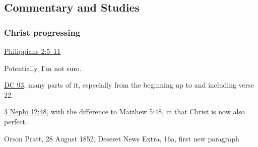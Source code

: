 	
	
	
	
\subsection{Commentary and Studies} %
	\label{CHRIST-COMMENTARY}

	
		
	\subsubsection{Christ progressing}
		\label{CHRIST-progressing}
		
		\begin{compactitem}
			\item \hyperref[PHILIPPIANS-2-5]{Philippians 2:5--11}
				\begin{compactitem}
					\item Potentially, I'm not sure.
				\end{compactitem}
			\item \hyperref[DC93]{DC 93}, many parts of it, especially from the beginning up to and including verse 22.
			\item \hyperref[3NEPHI-12-48]{3 Nephi 12:48}, with the difference to Matthew 5:48, in that Christ is now also perfect.
			\item Orson Pratt, 28 August 1852, Deseret News Extra, 16a, first new paragraph
		\end{compactitem}
		
